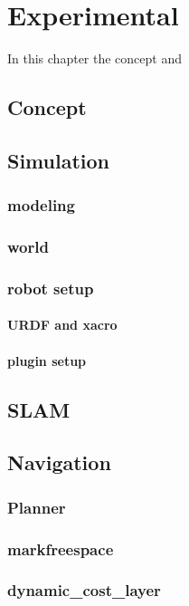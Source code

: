 \chapter{Experimental}
\label{experimental}

In this chapter the concept and  


\section{Concept}
\section{Simulation}
\subsection{modeling}
\subsection{world}
\subsection{robot setup}
\subsubsection{URDF and xacro}
\subsubsection{plugin setup}
\section{SLAM}

\section{Navigation}
\subsection{Planner}
\subsection{markfreespace}
\subsection{dynamic\_cost\_layer}

